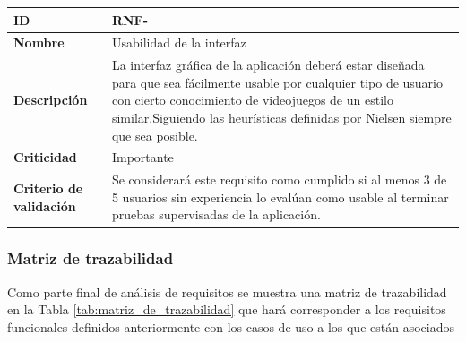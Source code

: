 \begin{center}
	\begin{tabular}{ | p{4.7cm} | p{10cm} | } 
		\hline
		
		\textbf{ID} & RNF-\arabic{contador_requisitos_no_funcionales}
		{contador_requisitos_no_funcionales} \\
		
		\hline 
		\textbf{Nombre} &
		Usabilidad de la interfaz\\ 
		
		\hline
		\textbf{Descripción} & 
		La interfaz gráfica de la aplicación deberá estar diseñada para que sea fácilmente usable por cualquier tipo de usuario con cierto conocimiento de videojuegos de un estilo similar.Siguiendo las heurísticas definidas por Nielsen \cite{nielsen} siempre que sea posible.\\
		
		\hline 
		\textbf{Criticidad} &
		Importante\\
		
		\hline 
		\textbf{Criterio de validación} & 
		Se considerará este requisito como cumplido si al menos 3 de 5 usuarios sin experiencia lo evalúan como usable al terminar pruebas supervisadas de la aplicación.\\
		
		\hline
	\end{tabular}
\end{center}


\subsubsection{Matriz de trazabilidad}

Como parte final de análisis de requisitos se muestra una matriz de trazabilidad en la Tabla \ref{tab:matriz_de_trazabilidad} que hará corresponder a los requisitos funcionales definidos anteriormente con los casos de uso a los que están asociados


